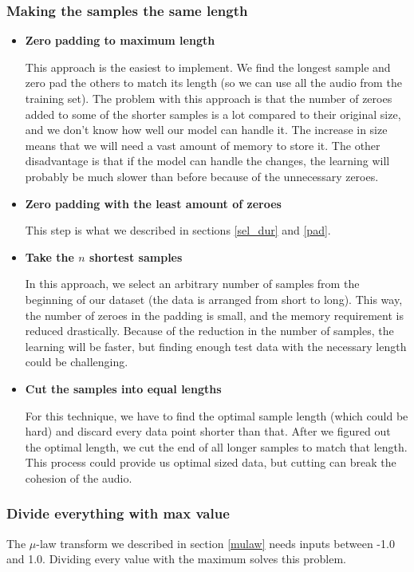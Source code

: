 \documentclass[12pt]{article}
\begin{document}
	\subsubsection{Making the samples the same length}
	\begin{itemize}
		\item \textbf{Zero padding to maximum length}
		
		This approach is the easiest to implement. We find the longest sample and zero pad the others to match its length (so we can use all the audio from the training set).
		The problem with this approach is that the number of zeroes added to some of the shorter samples is a lot compared to their original size, and we don't know how well our model can handle it. The increase in size means that we will need a vast amount of memory to store it.
		The other disadvantage is that if the model can handle the changes, the learning will probably be much slower than before because of the unnecessary zeroes.
		
		\item \textbf{Zero padding with the least amount of zeroes}
		
		This step is what we described in sections \ref{sel_dur} and \ref{pad}.
		
		\item \textbf{Take the $n$ shortest samples}
		
		In this approach, we select an arbitrary number of samples from the beginning of our dataset (the data is arranged from short to long). This way, the number of zeroes in the padding is small, and the memory requirement is reduced drastically. Because of the reduction in the number of samples, the learning will be faster, but finding enough test data with the necessary length could be challenging.
		
		\item \textbf{Cut the samples into equal lengths}
		
		For this technique, we have to find the optimal sample length (which could be hard) and discard every data point shorter than that. After we figured out the optimal length, we cut the end of all longer samples to match that length. This process could provide us optimal sized data, but cutting can break the cohesion of the audio.
		
		
		
	\end{itemize}
	\subsubsection{Divide everything with max value}
	The $\mu$-law transform we described in section \ref{mulaw} needs inputs between -1.0 and 1.0. Dividing every value with the maximum solves this problem.
	
\end{document}
